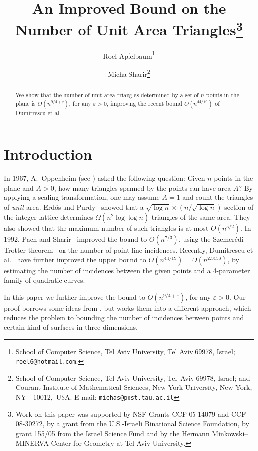 \documentclass[12pt]{article}
\def\eps{{\varepsilon}}
\begin{document}
\title{An Improved Bound on the Number of Unit Area Triangles\thanks{Work on this paper was supported by NSF Grants CCF-05-14079 and
  CCF-08-30272, 
  by a grant from the U.S.-Israeli Binational Science Foundation, 
  by grant 155/05 from the Israel Science Fund and by the
  Hermann Minkowski--MINERVA Center for Geometry at Tel Aviv University.} }
\author{
    Roel Apfelbaum\thanks{School of Computer Science, Tel Aviv University,
    Tel Aviv 69978, Israel;
    \texttt{roel6@hotmail.com}.}
    \and
  Micha Sharir\thanks{School of Computer Science, Tel Aviv University, Tel~Aviv 69978,
    Israel; and Courant Institute of Mathematical Sciences, New York
    University, New York, NY~~10012,~USA. E-mail:
    \texttt{michas@post.tau.ac.il}} }

\maketitle

\begin{abstract}
We show that the number of unit-area triangles determined by a set of
$n$ points in the plane is $O(n^{9/4+\eps})$, for any $\eps>0$,
improving the recent bound $O(n^{44/19})$ of Dumitrescu et al.
\end{abstract}


\section{Introduction}
\label{sec:intro}

In 1967, A.~Oppenheim (see \cite{EP95}) asked the following question:
Given $n$ points in the plane and $A>0$, how many triangles spanned
by the points can have area $A$? By applying a scaling transformation,
one may assume $A=1$ and count the triangles of {\em unit} area.
Erd\H{o}s and Purdy~\cite{EP71} showed that a $\sqrt{\log n}\times
(n/\sqrt{\log n})$ section of the integer lattice determines
$\Omega(n^2 \log\log{n})$ triangles of the same area. They also showed
that the maximum number of such triangles is at most $O(n^{5/2})$. In
1992, Pach and Sharir~\cite{PS92} improved the bound to
$O(n^{7/3})$, using the Szemer\'edi-Trotter theorem~\cite{ST83} 
on the number of point-line incidences. Recently,
Dumitrescu et al.~\cite{DST08} have further improved the upper bound 
to $O(n^{44/19})=O(n^{2.3158})$, by estimating the number of incidences
between the given points and a 4-parameter family of quadratic curves. 

In this paper we further improve the bound to $O(n^{9/4+\eps})$, for
any $\eps>0$. Our proof borrows some ideas from \cite{DST08}, but
works them into a different approach, which reduces the problem to 
bounding the number of incidences between points and certain kind 
of surfaces in three dimensions.
\end{document}
